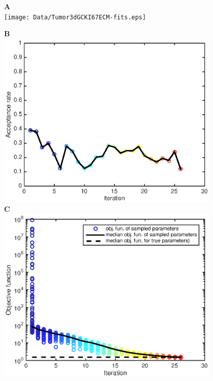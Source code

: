 \documentclass[10pt,letterpaper]{article}
\begin{document}
\begin{figure}[p]
\begin{adjustwidth}{-2in}{0in} %
\begin{center}
\textbf{A} \\ \texttt{[image: Data/Tumor3dGCKI67ECM-fits.eps]} \\
\begin{minipage}[t]{0.45\textwidth}
	\textbf{B} \\ \includegraphics[width=0.95\textwidth]{Data/Tumor3dGCKI67ECM-acceptanceRate.eps}\\
	\textbf{C} \\ \includegraphics[width=0.95\textwidth]{Data/Tumor3dGCKI67ECM-objFunc.eps}

\end{minipage}
\end{center}
\end{adjustwidth}
\end{figure}
\end{document}
